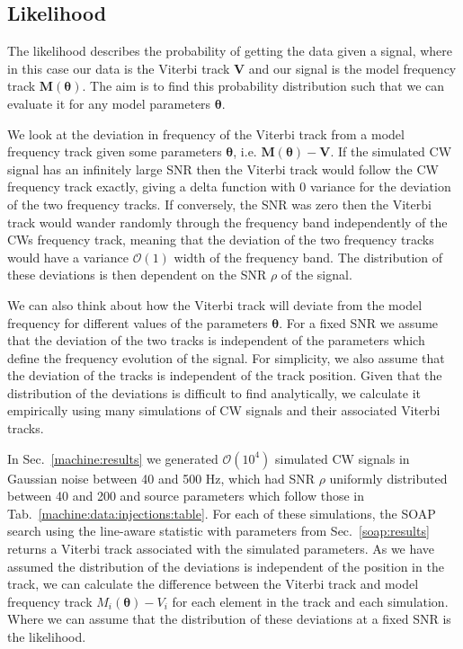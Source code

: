 %
%
\subsection{\label{par_est:bayes:likelihood}Likelihood}
%
%

The likelihood describes the probability of getting the data given a signal, where in this case our data is the Viterbi track $\bm{V}$ and our signal is the model frequency track $\bm{M}(\bm{\theta})$. 
The aim is to find this probability distribution such that we can evaluate it for any model parameters $\bm{\theta}$.

We look at the deviation in frequency of the Viterbi track from a model frequency track given some parameters $\bm{\theta}$, i.e. $\bm{M}(\bm{\theta}) - \bm{V}$.
If the simulated \gls{CW} signal has an infinitely large \gls{SNR}
then the Viterbi track would follow the \gls{CW} frequency track exactly, giving a delta function with 0 variance for the deviation of the two frequency tracks. If conversely, the \gls{SNR} was zero then the Viterbi track would
wander randomly through the frequency band independently of the \glspl{CW} frequency track,
meaning that the deviation of the two frequency tracks would have a variance $\mathcal{O}(1)$ width of the frequency band.
The distribution of these deviations is then dependent on the \gls{SNR} $\rho$ of the signal.  

We can also think about how the Viterbi track will deviate from the model frequency for different values of the parameters $\bm{\theta}$.
For a fixed \gls{SNR} we assume that the deviation of the two tracks is independent of the parameters which define the frequency evolution of the signal. 
For simplicity, we also assume that the deviation of the tracks is independent of the track position.
Given that the distribution of the deviations is difficult to find analytically, we calculate it empirically using many simulations of \gls{CW} signals and their associated Viterbi tracks. 

In Sec.~\ref{machine:results} we generated $\mathcal{O}(10^{4})$ simulated
\gls{CW} signals in Gaussian noise between 40 and 500 Hz, which had \gls{SNR}
$\rho$ uniformly distributed between 40 and 200 and
source parameters which follow those in
Tab.~\ref{machine:data:injections:table}. For each of these simulations, the
SOAP search using the line-aware statistic with parameters from
Sec.~\ref{soap:results} returns a Viterbi track associated with the simulated
parameters.  As we have assumed the distribution of the deviations is independent of the position in the track, we can calculate the difference between the Viterbi track and model frequency track $M_i(\bm{\theta}) - V_i$ for each
element in the track and each simulation.
Where we can assume that the distribution of these deviations at a fixed \gls{SNR} is the likelihood. 

